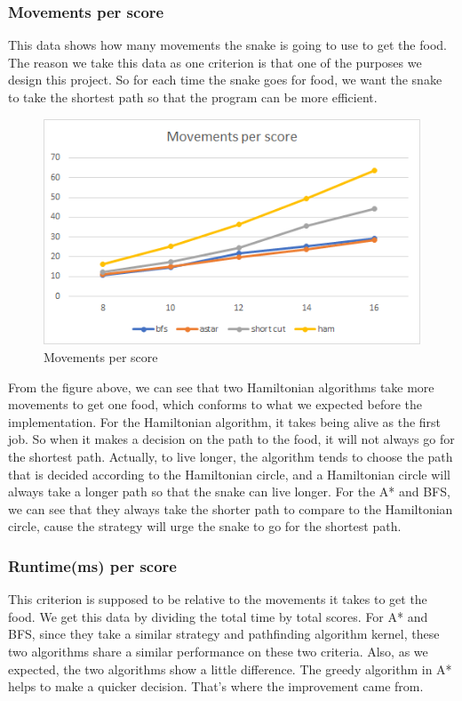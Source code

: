 \documentclass[12pt]{article}
\begin{document}
\subsubsection{Movements per score}
This data shows how many movements the snake is going to use to get the food. The reason 
we take this data as one criterion is that one of the purposes we design this project. So 
for each time the snake goes for food, we want the snake to take the shortest path so that 
the program can be more efficient. 

\begin{figure}[H]
    \centering 
    \includegraphics[scale = 0.9]{anay1.png}
    \caption{Movements per score}
\end{figure}

From the figure above, we can see that two Hamiltonian algorithms take more movements to get one 
food, which conforms to what we expected before the implementation. For the Hamiltonian algorithm, 
it takes being alive as the first job. So when it makes a decision on the path to the food, it 
will not always go for the shortest path. Actually, to live longer, the algorithm tends to 
choose the path that is decided according to the Hamiltonian circle, and a Hamiltonian circle will 
always take a longer path so that the snake can live longer. For the A* and BFS, we can see 
that they always take the shorter path to compare to the Hamiltonian circle, cause the strategy 
will urge the snake to go for the shortest path. 

\subsubsection{Runtime(ms) per score}

This criterion is supposed to be relative to the movements it takes to get the food. We get 
this data by dividing the total time by total scores. For A* and BFS, since they take a similar 
strategy and pathfinding algorithm kernel, these two algorithms share a similar performance on 
these two criteria. Also, as we expected, the two algorithms show a little difference. The 
greedy algorithm in A* helps to make a quicker decision. That's where the improvement came from. 
\end{document}
